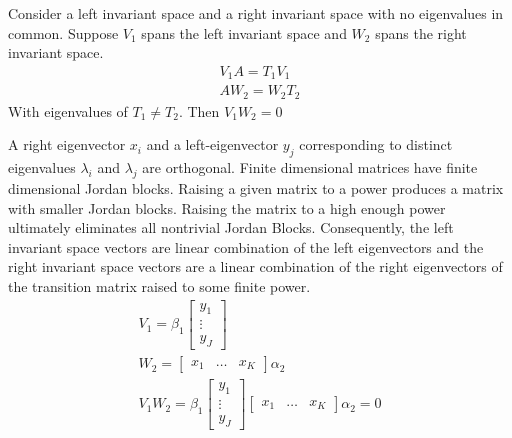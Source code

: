 \documentclass{elsart}
\begin{document}
\begin{thrm}\label{leftInv}
  Consider a left invariant space and a right invariant space
with no eigenvalues in common. Suppose
$V_1$ spans the left invariant space and $W_2$ spans the right invariant space.
  \begin{gather}
V_1 A = T_1 V_1\\
A W_2=  W_2 T_2
  \end{gather}
With eigenvalues of $T_1 \neq T_2$.
Then  $V_1 W_2=0$
\end{thrm}
\begin{prf}
A right eigenvector $x_i$ and a left-eigenvector $y_j$ corresponding to distinct
eigenvalues $\lambda_i$ and $\lambda_j$ are orthogonal.\cite{NOBLE}
Finite dimensional matrices have finite dimensional 
Jordan blocks.
Raising a given matrix to a power produces a matrix with
smaller Jordan blocks. Raising the matrix to a high enough power
ultimately eliminates all nontrivial Jordan Blocks.
Consequently, the left invariant space vectors are linear combination of the
left eigenvectors and the right invariant space vectors are a linear combination
of the right eigenvectors of the transition matrix raised to some finite power.
\begin{gather}
  V_1 = \beta_{1} 
  \begin{bmatrix}
y_1\\ \vdots\\ y_J
  \end{bmatrix}\\
  W_2 = 
  \begin{bmatrix}
x_1& \dots &x_K
  \end{bmatrix}
\alpha_{2}\\
V_1 W_2 =  \beta_{1} 
  \begin{bmatrix}
y_1\\ \vdots \\ y_J
  \end{bmatrix}
  \begin{bmatrix}
x_1& \dots &x_K
  \end{bmatrix}
\alpha_{2} = 0
\end{gather}
\end{prf}
\end{document}
